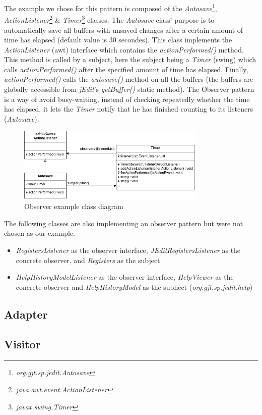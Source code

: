 The example we chose for this pattern is composed of the
\emph{Autosave}\footnote{\emph{org.gjt.sp.jedit.Autosave}},
\emph{ActionListener}\footnote{\emph{java.awt.event.ActionListener}} \&
\emph{Timer}\footnote{\emph{javax.swing.Timer}} classes. The
\emph{Autosave} class' purpose is to automatically save all buffers with
unsaved changes after a certain amount of time has elapsed (default
value is 30 secondes). This class implements the \emph{ActionListener}
(awt) interface which contains the \emph{actionPerformed()} method. This
method is called by a subject, here the subject being a \emph{Timer}
(swing) which calls \emph{actionPerformed()} after the specified amount
of time has elapsed. Finally, \emph{actionPerformed()} calls the
\emph{autosave()} method on all the buffers (the buffers are globally
accessible from \emph{jEdit}'s \emph{getBuffer()} static method). The
Observer pattern is a way of avoid busy-waiting, instead of checking
repeatedly whether the time has elapsed, it lets the \emph{Timer} notify
that he has finished counting to its listeners (\emph{Autosave}).

\begin{figure}[h!]
    \includegraphics[width=0.8\textwidth]{images/observer.png}
    \centering
    \caption{Observer example class diagram}
\end{figure}

\begin{framehint}
    The following classes are also implementing an observer pattern but were
    not chosen as our example.

    \begin{itemize}\itemsep1pt
        \item \emph{RegistersListener} as the observer interface,
        \emph{JEditRegistersListener} as the concrete observer, and
        \emph{Registers} as the subject

        \item \emph{HelpHistoryModelListener} as the observer interface,
          \emph{HelpViewer} as the concrete observer and \emph{HelpHistoryModel}
          as the subhect (\emph{org.gjt.sp.jedit.help})
    \end{itemize}
\end{framehint}
\newpage

\subsection{Adapter}

\subsection{Visitor}

\newpage
